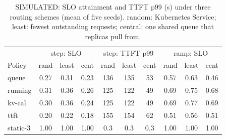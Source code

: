 \begin{table}[t]
\centering
\caption{SIMULATED: SLO attainment and TTFT p99 (s) under three routing schemes
(mean of five seeds). random: Kubernetes Service; least: fewest outstanding
requests; central: one shared queue that replicas pull from.}
\label{tab:routing}
\small
\setlength{\tabcolsep}{2.3pt}
\begin{tabular}{lccc|ccc|ccc}
\toprule
 & \multicolumn{3}{c|}{step: SLO} & \multicolumn{3}{c|}{step: TTFT p99} & \multicolumn{3}{c}{ramp: SLO} \\
Policy & rand & least & cent & rand & least & cent & rand & least & cent \\
\midrule
queue & 0.27 & 0.31 & 0.23 & 136 & 135 & 53 & 0.57 & 0.63 & 0.46 \\
running & 0.31 & 0.36 & 0.26 & 125 & 122 & 49 & 0.69 & 0.75 & 0.68 \\
kv-cal & 0.30 & 0.36 & 0.24 & 125 & 122 & 49 & 0.69 & 0.77 & 0.69 \\
ttft & 0.20 & 0.22 & 0.18 & 155 & 154 & 62 & 0.51 & 0.56 & 0.51 \\
static-3 & 1.00 & 1.00 & 1.00 & 0.3 & 0.3 & 0.3 & 1.00 & 1.00 & 1.00 \\
\bottomrule
\end{tabular}
\end{table}

